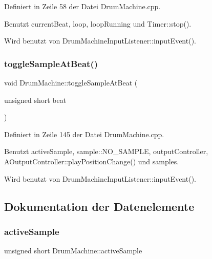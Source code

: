 Definiert in Zeile 58 der Datei Drum\+Machine.\+cpp.



Benutzt current\+Beat, loop, loop\+Running und Timer\+::stop().



Wird benutzt von Drum\+Machine\+Input\+Listener\+::input\+Event().

\mbox{\label{class_drum_machine_ac34e64779cd419a75628630f71a3041b}} 
\subsubsection{\texorpdfstring{toggle\+Sample\+At\+Beat()}{toggleSampleAtBeat()}}
{\footnotesize\ttfamily void Drum\+Machine\+::toggle\+Sample\+At\+Beat (\begin{DoxyParamCaption}\item[{unsigned short}]{beat }\end{DoxyParamCaption})}



Definiert in Zeile 145 der Datei Drum\+Machine.\+cpp.



Benutzt active\+Sample, sample\+::\+N\+O\+\_\+\+S\+A\+M\+P\+LE, output\+Controller, A\+Output\+Controller\+::play\+Position\+Change() und samples.



Wird benutzt von Drum\+Machine\+Input\+Listener\+::input\+Event().



\subsection{Dokumentation der Datenelemente}
\mbox{\label{class_drum_machine_a9e12916e5724251791689e6f14c8513a}} 
\subsubsection{\texorpdfstring{active\+Sample}{activeSample}}
{\footnotesize\ttfamily unsigned short Drum\+Machine\+::active\+Sample\hspace{0.3cm}{\ttfamily [private]}}



